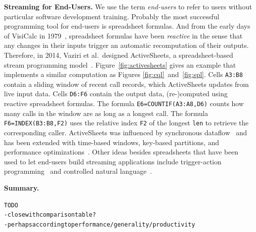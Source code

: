 \textbf{Streaming for End-Users.}
%
We use the term \emph{end-users} to refer to users without particular
software development training. Probably the most successful
programming tool for end-users is spreadsheet formulas. And from the
early days of VisiCalc in 1979~\cite{bricklin_frankston_1979},
spreadsheet formulas have been \emph{reactive} in the sense that any
changes in their inputs trigger an automatic recomputation of their
outputs. Therefore, in 2014, Vaziri et al.\ designed ActiveSheets, a
spreadsheet-based stream programming model~\cite{vaziri_et_al_2014}.
Figure~\ref{fig:activesheets} gives an example that implements a
similar computation as Figures \mbox{\ref{fig:cql} and \ref{fig:spl}}.
Cells \lstinline{A3:B8} contain a sliding window of recent call
records, which ActiveSheets updates from live input data. Cells
\lstinline{D6:F6} contain the output data, \mbox{(re-)}com\-pu\-ted
using reactive spreadsheet formulas. The formula
\mbox{\lstinline{E6=COUNTIF(A3:A8,D6)}} counts how many calls in the
window are as long as a longest call. The formula
\mbox{\lstinline{F6=INDEX(B3:B8,F2)}} uses the relative index \lstinline{F2}
of the longest \lstinline{len} to retrieve the corresponding
caller.  ActiveSheets was influenced by
synchronous data\-flow~\cite{lustre_1987} and has been extended with
time-based windows, key-based partitions, and performance
optimizations~\cite{hirzel_et_al_2016}. Other ideas besides
spreadsheets that have been used to let end-users build streaming
applications include trigger-action programming~\cite{ifttt} and
controlled natural language~\cite{arnold_et_al_2016}.

\textbf{Summary.}
\begin{alltt}TODO\scriptsize
- close with comparison table?
- perhaps according to performance/generality/productivity
\end{alltt}
